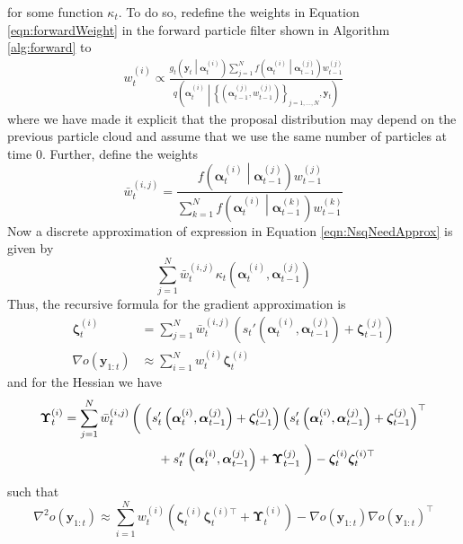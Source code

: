 \documentclass[notitlepage]{article}
\renewcommand{\vec}[1]{\bm{#1}}
\newcommand{\mat}[1]{\mathbf{#1}}
\newcommand{\Lbrace}[1]{\left\{ #1\right\}}
\newcommand{\Lparen}[1]{\left( #1\right)}
\newcommand{\Cond}[2]{ #1 \middle\vert  #2}
\newcommand{\optor}[2]{#1\Lparen{#2}}
\newcommand{\optorC}[3]{\optor{#1}{\Cond{#2}{#3}}}
\newcommand{\gFunc}[3]{\optorC{g_{#3}}{#1}{#2}}
\newcommand{\fFunc}[2]{\optorC{f}{#1}{#2}}
\newcommand{\IDC}[2]{\optorC{q}{#1}{#2}}
\newcommand{\partic}[3]{#1_{#2}^{\Lparen{#3}}}
\begin{document}
% 
for some function $\kappa_t$. To do so, redefine the weights 
in Equation \eqref{eqn:forwardWeight} in the forward particle filter shown 
in Algorithm \ref{alg:forward} to %
%
\begin{align*}
\partic{w}{t}{i} \propto \frac{
		\gFunc{\vec{y}_t}{\partic{\vec{\alpha}}{t}{i}}{t}
		\sum_{j=1}^N\fFunc{\partic{\vec{\alpha}}{t}{i}}{\partic{\vec{\alpha}}{t-1}{j}}
		\partic{w}{t-1}{j}
	}{
		\IDC{\partic{\vec{\alpha}}{t}{i}}{
		\Lbrace{\Lparen{
			\partic{\vec{\alpha}}{t-1}{j}, \partic{w}{t-1}{j}}}_{j=1,\dots,N}, \vec{y}_t}
	}
\end{align*}%
% 
where we have made it explicit that the proposal distribution may depend on 
the previous particle cloud and assume that we use the same number of particles 
at time 0. Further, define the weights
%
\begin{equation}\label{eqn:NsqGradWeights}
\partic{\bar w}{t}{i,j} = 
	\frac{
	\fFunc{\partic{\vec{\alpha}}{t}{i}}{\partic{\vec{\alpha}}{t-1}{j}}
	\partic{w}{t-1}{j}}{
	\sum_{k=1}^N\fFunc{\partic{\vec{\alpha}}{t}{i}}{\partic{\vec{\alpha}}{t-1}{k}}
	\partic{w}{t-1}{k}
	}
\end{equation}
%
Now a discrete approximation of expression in 
Equation \eqref{eqn:NsqNeedApprox} is given by %
%
$$
\sum_{j=1}^N 
\partic{\bar w}{t}{i,j}
\kappa_t\Lparen{
	\partic{\vec{\alpha}}{t}{i}, \partic{\vec{\alpha}}{t-1}{j}}
$$
%
Thus, the recursive formula for the gradient approximation is 
%
\begin{align}
\partic{\vec\zeta}{t}{i} &= \sum_{j = 1}^N
	\partic{\bar w}{t}{i,j}\Lparen{
	s_t'\Lparen{\partic{\vec{\alpha}}{t}{i}, 
		\partic{\vec{\alpha}}{t-1}{j}} +  
		\partic{\vec\zeta}{t-1}{j}}\label{eqn:NSqGrad}\\
%
\nabla o\Lparen{\vec y_{1:t}} &\approx 
	\sum_{i = 1}^N
	\partic{w}{t}{i}\partic{\vec\zeta}{t}{i}\nonumber
\end{align}
%
and for the Hessian we have %
%
\begin{align}
\partic{\mat\Upsilon}{t}{i} &= \sum_{j = 1}^N
	\partic{\bar w}{t}{i,j}
	\left(\vphantom{\int}\right.
		\Lparen{s_t'\Lparen{
			\partic{\vec{\alpha}}{t}{i}, 
			\partic{\vec{\alpha}}{t-1}{j}}
			+ \partic{\vec\zeta}{t-1}{j}} 
		\Lparen{s_t'\Lparen{
			\partic{\vec{\alpha}}{t}{i}, 
			\partic{\vec{\alpha}}{t-1}{j}}
			+ \partic{\vec\zeta}{t-1}{j}}^\top\label{eqn:NSqHess} \\
&\hspace{75pt}+
		s_t''\Lparen{
			\partic{\vec{\alpha}}{t}{i}, 
			\partic{\vec{\alpha}}{t-1}{j}} + 
		\partic{\mat\Upsilon}{t - 1}{j}
		\left.\vphantom{\int}\right) - 
		\partic{\vec\zeta}{t}{i}\vec\zeta_t^{(i)\top}\nonumber
\end{align}%
% 
such that %
%
$$
\nabla^2 o\Lparen{\vec y_{1:t}} \approx 
	\sum_{i = 1}^N
	\partic{w}{t}{i}\Lparen{
		\partic{\vec\zeta}{t}{i}\vec\zeta_t^{(i)\top}
		+ \partic{\mat\Upsilon}{t}{i}}
	- \nabla o\Lparen{\vec y_{1:t}}
	  \nabla o\Lparen{\vec y_{1:t}}^\top
$$
\end{document}

